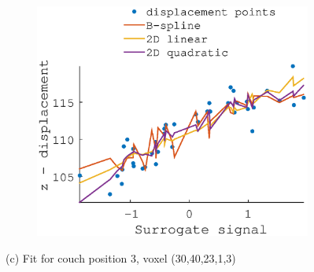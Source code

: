 \documentclass[11pt,a4paper,oneside]{report}
\begin{document}
\begin{figure}[H]
\begin{subfigure}[b]{0.33\textwidth}
  \end{subfigure}
    ~ %
  \begin{subfigure}[b]{0.33\textwidth}
    \includegraphics[width=\textwidth, trim=0 0 0 110,clip=true]{figures/task2/fit_round3_couch3.eps}
  \end{subfigure}
  (c) Fit for couch position 3, voxel (30,40,23,1,3)
  \vspace*{1em}
  

\end{figure}
\end{document}
